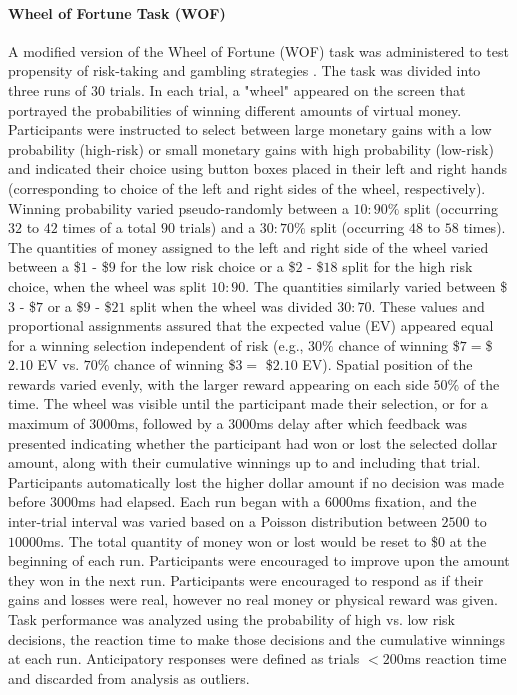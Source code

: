 \documentclass[utf8]{stylesheet}
\begin{document}
\paragraph{Wheel of Fortune Task (WOF)} A modified version of the Wheel of Fortune (WOF) task was administered to test propensity of risk-taking and gambling strategies \citep{ernst2004wheeloffortune}. The task was divided into three runs of 30 trials. In each trial, a "wheel" appeared on the screen that portrayed the probabilities of winning different amounts of virtual money. Participants were instructed to select between large monetary gains with a low probability (high-risk) or small monetary gains with high probability (low-risk) and indicated their choice using button boxes placed in their left and right hands (corresponding to choice of the left and right sides of the wheel, respectively). Winning probability varied pseudo-randomly between a $10:90\%$ split (occurring $32$ to $42$ times of a total $90$ trials) and a $30:70\%$ split (occurring $48$ to $58$ times). The quantities of money assigned to the left and right side of the wheel varied between a \$$1$ - \$$9$ for the low risk choice or a \$$2$ - \$$18$ split for the high risk choice, when the wheel was split $10:90$. The quantities similarly varied between \$$3$ - \$$7$ or a \$$9$ - \$$21$ split when the wheel was divided $30:70$.  These values and proportional assignments assured that the expected value (EV) appeared equal for a winning selection independent of risk (e.g., $30\%$ chance of winning \$$7 = $\$$2.10$ EV vs. $70\%$ chance of winning \$$3 =$ \$$2.10$ EV).  Spatial position of the rewards varied evenly, with the larger reward appearing on each side $50\%$ of the time.  The wheel was visible until the participant made their selection, or for a maximum of $3000$ms, followed by a $3000$ms delay after which feedback was presented indicating whether the participant had won or lost the selected dollar amount, along with their cumulative winnings up to and including that trial.  Participants automatically lost the higher dollar amount if no decision was made before $3000$ms had elapsed.  Each run began with a $6000$ms fixation, and the inter-trial interval was varied based on a Poisson distribution between $2500$ to $10000$ms. The total quantity of money won or lost would be reset to \$$0$ at the beginning of each run. Participants were encouraged to improve upon the amount they won in the next run.  Participants were encouraged to respond as if their gains and losses were real, however no real money or physical reward was given. Task performance was analyzed using the probability of high vs. low risk decisions, the reaction time to make those decisions and the cumulative winnings at each run. Anticipatory responses were defined as trials $<200$ms reaction time and discarded from analysis as outliers.
\end{document}
